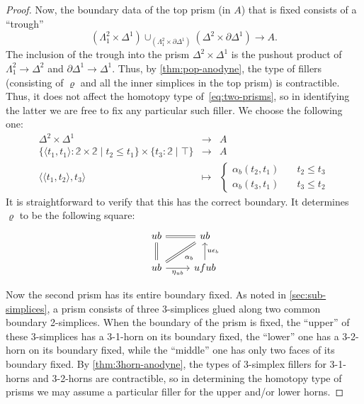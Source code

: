 \documentclass[12pt]{amsart}
\theoremstyle{plain}
\theoremstyle{definition}
\theoremstyle{remark}
\numberwithin{equation}{section}
\newcommand{\sh}[2]{\{#1\mid #2\}}
\newcommand{\pair}[1]{\langle #1\rangle}
\newcommand{\two}{\mathbb{2}}
\begin{document}
\begin{proof}
  Now, the boundary data of the top prism (in $A$) that is fixed consists of a ``trough''
  \[(\Lambda^2_1 \times \Delta^1) \cup_{(\Lambda^2_1 \times \partial\Delta^1)} (\Delta^2 \times \partial\Delta^1) \to A. \]
  The inclusion of the trough into the prism $\Delta^2\times \Delta^1$ is the pushout product of $\Lambda^2_1 \to\Delta^2$ and $\partial\Delta^1 \to \Delta^1$.
  Thus, by \cref{thm:pop-anodyne}, the type of fillers (consisting of $\varrho$ and all the inner simplices in the top prism) is contractible.
  Thus, it does not affect the homotopy type of~\eqref{eq:two-prisms}, so in identifying the latter we are free to fix any particular such filler.
  We choose the following one:
  \[\begin{array}{ccl}
      \Delta^2 \times \Delta^1 &\to& A\\
      \sh{\pair{t_1,t_1}:\two\times\two}{t_2\le t_1} \times \sh{t_3:\two}{\top} &\to& A\\
      \pair{\pair{t_1,t_2},t_3} &\mapsto&
                                          \begin{cases}
                                            \alpha_{b}(t_2,t_1) &\quad t_2\le t_3\\
                                            \alpha_{b}(t_3,t_1) &\quad t_3\le t_2
                                          \end{cases}
    \end{array}
  \]
  It is straightforward to verify that this has the correct boundary.
  It determines $\varrho$ to be the following square:
  \[
  \begin{tikzcd}
    ub \ar[r,equals] & ub \\
    ub \ar[u,equals] \ar[ur,equals] \ar[r,"\eta_{ub}"'] & ufub \ar[u,"u\epsilon_b"'] \ar[ul,phantom,"\scriptstyle\alpha_b" very near start]
  \end{tikzcd}
  \]

  Now the second prism has its entire boundary fixed.
  As noted in \cref{sec:sub-simplices}, a prism consists of three 3-simplices glued along two common boundary 2-simplices.
  When the boundary of the prism is fixed, the ``upper'' of these 3-simplices has a 3-1-horn on its boundary fixed, the ``lower'' one has a 3-2-horn on its boundary fixed, while the ``middle'' one has only two faces of its boundary fixed.
  By \cref{thm:3horn-anodyne}, the types of 3-simplex fillers for 3-1-horns and 3-2-horns are contractible, so in determining the homotopy type of prisms we may assume a particular filler for the upper and/or lower horns.


\end{proof}
\end{document}
